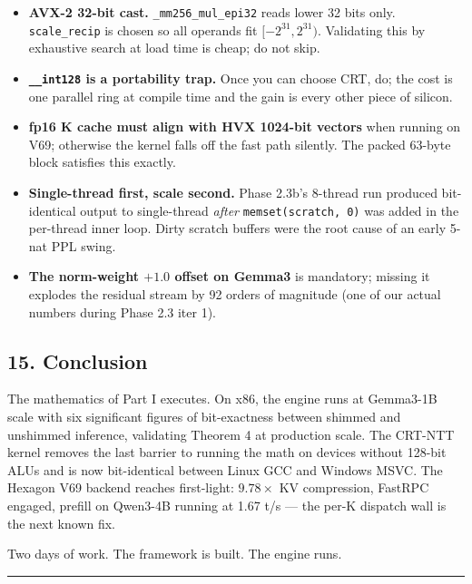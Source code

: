 \documentclass[
  11pt,
]{article}
\providecommand{\tightlist}{%
  \setlength{\itemsep}{0pt}\setlength{\parskip}{0pt}}
\begin{document}
\begin{itemize}
\tightlist
\item
  \textbf{AVX-2 32-bit cast.} \texttt{\_mm256\_mul\_epi32} reads lower
  32 bits only. \texttt{scale\_recip} is chosen so all operands fit
  \([-2^{31}, 2^{31})\). Validating this by exhaustive search at load
  time is cheap; do not skip.
\item
  \textbf{\texttt{\_\_int128} is a portability trap.} Once you can
  choose CRT, do; the cost is one parallel ring at compile time and the
  gain is every other piece of silicon.
\item
  \textbf{fp16 K cache must align with HVX 1024-bit vectors} when
  running on V69; otherwise the kernel falls off the fast path silently.
  The packed 63-byte block satisfies this exactly.
\item
  \textbf{Single-thread first, scale second.} Phase 2.3b's 8-thread run
  produced bit-identical output to single-thread \emph{after}
  \texttt{memset(scratch,\ 0)} was added in the per-thread inner loop.
  Dirty scratch buffers were the root cause of an early 5-nat PPL swing.
\item
  \textbf{The norm-weight \(+1.0\) offset on Gemma3} is mandatory;
  missing it explodes the residual stream by 92 orders of magnitude (one
  of our actual numbers during Phase 2.3 iter 1).
\end{itemize}

\hypertarget{conclusion}{%
\subsection{15. Conclusion}\label{conclusion}}

The mathematics of Part I executes. On x86, the engine runs at Gemma3-1B
scale with six significant figures of bit-exactness between shimmed and
unshimmed inference, validating Theorem 4 at production scale. The
CRT-NTT kernel removes the last barrier to running the math on devices
without 128-bit ALUs and is now bit-identical between Linux GCC and
Windows MSVC. The Hexagon V69 backend reaches first-light:
\(9.78\times\) KV compression, FastRPC engaged, prefill on Qwen3-4B
running at 1.67 t/s --- the per-K dispatch wall is the next known fix.

Two days of work. The framework is built. The engine runs.

\begin{center}\rule{0.5\linewidth}{0.5pt}\end{center}
\end{document}
